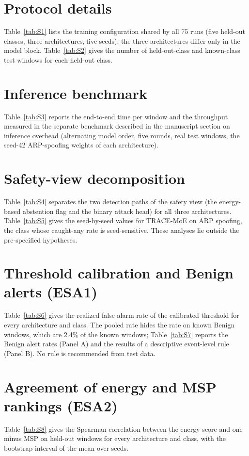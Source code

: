 \documentclass[10pt,a4paper]{article}
\begin{document}
\section{Protocol details}\label{sec:n2}
Table~\ref{tab:S1} lists the training configuration shared by all 75 runs (five held-out classes, three architectures, five seeds); the three architectures differ only in the model block. Table~\ref{tab:S2} gives the number of held-out-class and known-class test windows for each held-out class.



\section{Inference benchmark}\label{sec:n3}
Table~\ref{tab:S3} reports the end-to-end time per window and the throughput measured in the separate benchmark described in the manuscript section on inference overhead (alternating model order, five rounds, real test windows, the seed-42 ARP-spoofing weights of each architecture).


\section{Safety-view decomposition}\label{sec:n4}
Table~\ref{tab:S4} separates the two detection paths of the safety view (the energy-based abstention flag and the binary attack head) for all three architectures. Table~\ref{tab:S5} gives the seed-by-seed values for TRACE-MoE on ARP spoofing, the class whose caught-any rate is seed-sensitive. These analyses lie outside the pre-specified hypotheses.



\section{Threshold calibration and Benign alerts (ESA1)}\label{sec:n5}
Table~\ref{tab:S6} gives the realized false-alarm rate of the calibrated threshold for every architecture and class. The pooled rate hides the rate on known Benign windows, which are 2.4\% of the known windows; Table~\ref{tab:S7} reports the Benign alert rates (Panel A) and the results of a descriptive event-level rule (Panel B). No rule is recommended from test data.



\section{Agreement of energy and MSP rankings (ESA2)}\label{sec:n6}
Table~\ref{tab:S8} gives the Spearman correlation between the energy score and one minus MSP on held-out windows for every architecture and class, with the bootstrap interval of the mean over seeds.

\end{document}
